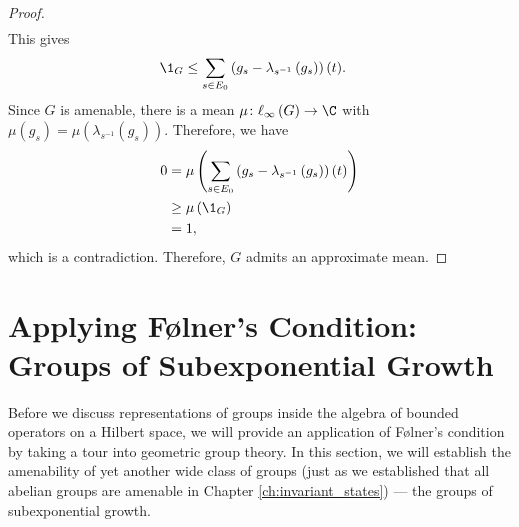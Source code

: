 \begin{proof}
\begin{align*}
  \end{align*}
  This gives
  \begin{align*}
    \1_{G} &\leq \sum_{s\in E_0}\left( g_s - \lambda_{s^{-1}}\left(g_s\right) \right)(t).
  \end{align*}
  Since $G$ is amenable, there is a mean $\mu\colon \ell_{\infty}\left(G\right)\rightarrow \C$ with $\mu\left(g_s\right) = \mu\left(\lambda_{s^{-1}}\left(g_s\right)\right)$. Therefore, we have
  \begin{align*}
    0 &= \mu\left(\sum_{s\in E_0}\left(g_s - \lambda_{s^{-1}}\left(g_s\right)\right)\left(t\right)\right)\\
      &\geq \mu\left(\1_{G}\right)\\
      &= 1,
  \end{align*}
  which is a contradiction. Therefore, $G$ admits an approximate mean.
\end{proof}
\section{Applying Følner's Condition: Groups of Subexponential Growth}\label{sec:subexponential_growth}%
Before we discuss representations of groups inside the algebra of bounded operators on a Hilbert space, we will provide an application of Følner's condition by taking a tour into geometric group theory. In this section, we will establish the amenability of yet another wide class of groups (just as we established that all abelian groups are amenable in Chapter \ref{ch:invariant_states}) --- the groups of subexponential growth.\newline

